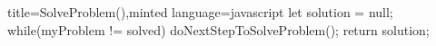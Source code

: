 \documentclass[varwidth]{standalone}
\begin{document}
\begin{ccode}[autogobble]{title=SolveProblem(),minted language=javascript}
let solution = null;
while(myProblem != solved){
    doNextStepToSolveProblem();
}
return solution;
\end{ccode}
\end{document}
